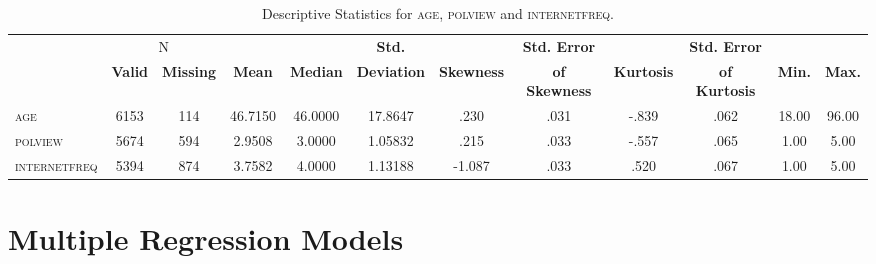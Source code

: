 \clearpage{}

\pagestyle{plain}
\begin{sidewaystable}
\centering{}%
\begin{minipage}[t]{1\columnwidth}%
\begin{center}
\renewcommand{\arraystretch}{2}%
\begin{tabular}{lccccccccccc}
\hline 
 & \multicolumn{2}{c}{{\small{}N}} &  &  & \textbf{\small{}Std.} &  & \textbf{\small{}Std. Error} &  & \textbf{\small{}Std. Error} &  & \tabularnewline
 & \textbf{\small{}Valid} & \textbf{\small{}Missing} & \textbf{\small{}Mean} & \textbf{\small{}Median} & \textbf{\small{}Deviation} & \textbf{\small{}Skewness} & \textbf{\small{}of Skewness} & \textbf{\small{}Kurtosis} & \textbf{\small{}of Kurtosis} & \textbf{\small{}Min.} & \textbf{\small{}Max.}\tabularnewline
\hline 
\hline 
\textsc{\small{}age} & {\small{}6153} & {\small{}114} & {\small{}46.7150} & {\small{}46.0000} & {\small{}17.8647} & {\small{}.230} & {\small{}.031} & {\small{}-.839} & {\small{}.062} & {\small{}18.00} & {\small{}96.00}\tabularnewline
\textsc{\small{}polview} & {\small{}5674} & {\small{}594} & {\small{}2.9508} & {\small{}3.0000} & {\small{}1.05832} & {\small{}.215} & {\small{}.033} & {\small{}-.557} & {\small{}.065} & {\small{}1.00} & {\small{}5.00}\tabularnewline
\textsc{\small{}internetfreq} & {\small{}5394} & {\small{}874} & {\small{}3.7582} & {\small{}4.0000} & {\small{}1.13188} & {\small{}-1.087} & {\small{}.033} & {\small{}.520} & {\small{}.067} & {\small{}1.00} & {\small{}5.00}\tabularnewline
\hline 
\end{tabular}\bigskip{}
\par\end{center}
\begin{center}
\caption{Descriptive Statistics for \textsc{age}, \textsc{polview} and \textsc{internetfreq}.\label{tab:Descriptive-Statistics-forNumerical}}
\par\end{center}%
\end{minipage}
\end{sidewaystable}
\clearpage{}\pagestyle{fancy}

\section{Multiple Regression Models}

